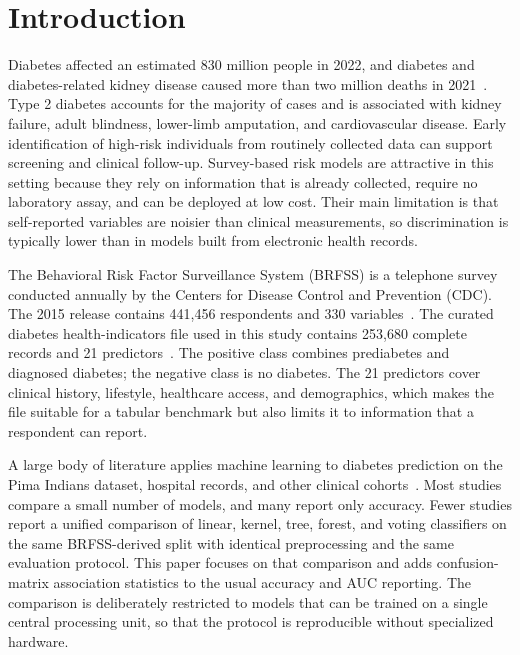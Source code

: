 \documentclass[conference]{IEEEtran}
\begin{document}
\section{Introduction}

Diabetes affected an estimated 830 million people in 2022, and diabetes and diabetes-related kidney disease caused more than two million deaths in 2021~\cite{who2021}. Type 2 diabetes accounts for the majority of cases and is associated with kidney failure, adult blindness, lower-limb amputation, and cardiovascular disease. Early identification of high-risk individuals from routinely collected data can support screening and clinical follow-up. Survey-based risk models are attractive in this setting because they rely on information that is already collected, require no laboratory assay, and can be deployed at low cost. Their main limitation is that self-reported variables are noisier than clinical measurements, so discrimination is typically lower than in models built from electronic health records.

The Behavioral Risk Factor Surveillance System (BRFSS) is a telephone survey conducted annually by the Centers for Disease Control and Prevention (CDC). The 2015 release contains 441,456 respondents and 330 variables~\cite{cdc2015brfss}. The curated diabetes health-indicators file used in this study contains 253,680 complete records and 21 predictors~\cite{kaggle2021diabetes}. The positive class combines prediabetes and diagnosed diabetes; the negative class is no diabetes. The 21 predictors cover clinical history, lifestyle, healthcare access, and demographics, which makes the file suitable for a tabular benchmark but also limits it to information that a respondent can report.

A large body of literature applies machine learning to diabetes prediction on the Pima Indians dataset, hospital records, and other clinical cohorts~\cite{ahmed2022ieee,peerbashab2023,chowdhury2024brfss,zhang2025brfss,bhattacharya2023ieee}. Most studies compare a small number of models, and many report only accuracy. Fewer studies report a unified comparison of linear, kernel, tree, forest, and voting classifiers on the same BRFSS-derived split with identical preprocessing and the same evaluation protocol. This paper focuses on that comparison and adds confusion-matrix association statistics to the usual accuracy and AUC reporting. The comparison is deliberately restricted to models that can be trained on a single central processing unit, so that the protocol is reproducible without specialized hardware.
\end{document}
